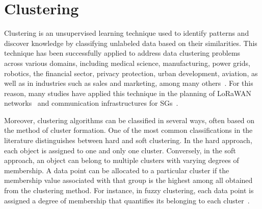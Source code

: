 \documentclass[a4paper,fleqn]{cas-dc}
\begin{document}


\section{Clustering} \label{sec:clustering}

Clustering is an unsupervised learning technique used to identify patterns and discover knowledge by classifying unlabeled data based on their similarities. This technique has been successfully applied to address data clustering problems across various domains, including medical science, manufacturing, power grids, robotics, the financial sector, privacy protection, urban development, aviation, as well as in industries such as sales and marketing, among many others~\cite{mandhi2021clustering}. For this reason, many studies have applied this technique in the planning of \gls{LoRaWAN} networks~\cite{matni2020lorawan, neriPerformance2022} and communication infrastructures for \gls{SGs}~\cite{si2021clustering, alonso2022clustering, piechowiak2023lorawan, gallardo2021clustering}.

Moreover, clustering algorithms can be classified in several ways, often based on the method of cluster formation. One of the most common classifications in the literature distinguishes between hard and soft clustering. In the hard approach, each object is assigned to one and only one cluster. Conversely, in the soft approach, an object can belong to multiple clusters with varying degrees of membership. A data point can be allocated to a particular cluster if the membership value associated with that group is the highest among all obtained from the clustering method. For instance, in fuzzy clustering, each data point is assigned a degree of membership that quantifies its belonging to each cluster~\cite{oyewole2023data}.
\end{document}
